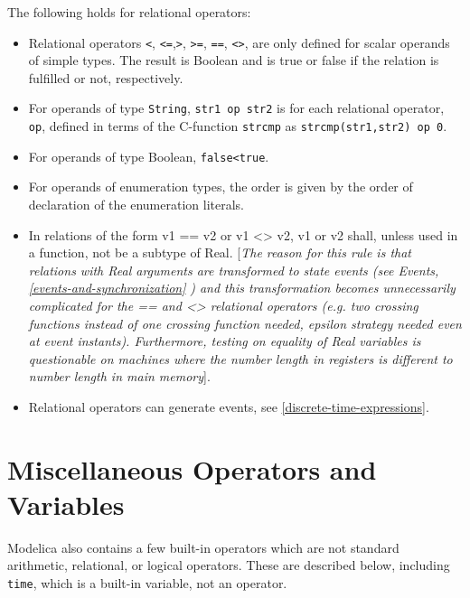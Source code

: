 The following holds for relational operators:

\begin{itemize}
\item
  Relational operators \lstinline[basicstyle=\ttfamily]!<!, \lstinline[basicstyle=\ttfamily]!<=!,\lstinline[basicstyle=\ttfamily]!>!,
\lstinline[basicstyle=\ttfamily]!>=!, \lstinline[basicstyle=\ttfamily]!==!, \lstinline[basicstyle=\ttfamily]!<>!, are only defined for
  scalar operands of simple types. The result is Boolean and is true or
  false if the relation is fulfilled or not, respectively.
\item
  For operands of type \lstinline[basicstyle=\ttfamily]!String!, \lstinline[basicstyle=\ttfamily]!str1 op str2! is for each relational
  operator, \lstinline[basicstyle=\ttfamily]!op!, defined in terms of the C-function \lstinline[basicstyle=\ttfamily]!strcmp! as
  \lstinline[basicstyle=\ttfamily]!strcmp(str1,str2) op 0!.
\item
  For operands of type Boolean, 
\lstinline[basicstyle=\ttfamily]!false<true!.
\item
  For operands of enumeration types, the order is given by the order of
  declaration of the enumeration literals.
\item
  In relations of the form v1 == v2 or v1 \textless{}\textgreater{} v2,
  v1 or v2 shall, unless used in a function, not be a subtype of Real.
  {[}\emph{The reason for this rule is that relations with Real
  arguments are transformed to state events (see Events, \autoref{events-and-synchronization}}
  \emph{) and this transformation becomes unnecessarily complicated
  for the == and \textless{}\textgreater{} relational operators (e.g.
  two crossing functions instead of one crossing function needed,
  epsilon strategy needed even at event instants). Furthermore, testing
  on equality of Real variables is questionable on machines where the
  number length in registers is different to number length in main
  memory}{]}.
\item
  Relational operators can generate events, see \autoref{discrete-time-expressions}.
\end{itemize}

\section{Miscellaneous Operators and Variables}

Modelica also contains a few built-in operators which are not standard
arithmetic, relational, or logical operators. These are described below,
including \lstinline[basicstyle=\ttfamily]!time!, which is a built-in variable, not an operator.

